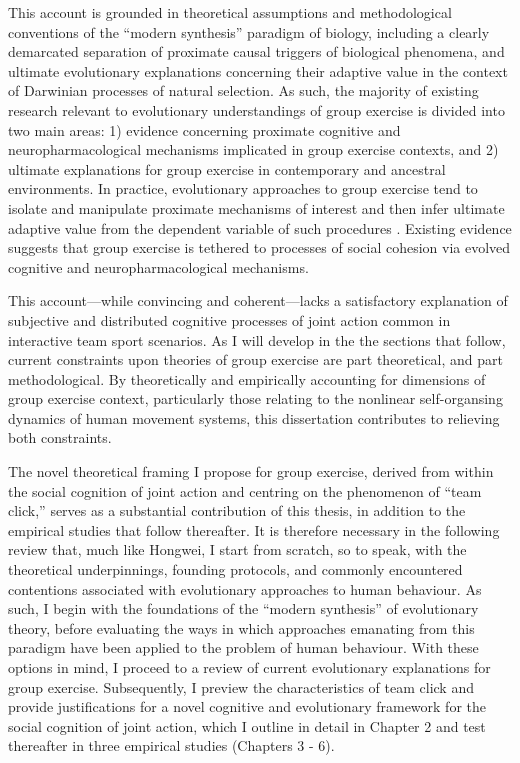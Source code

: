 This account is grounded in theoretical assumptions and methodological conventions of the ``modern synthesis'' paradigm of biology, including a clearly demarcated separation of proximate causal triggers of biological phenomena, and ultimate evolutionary explanations concerning their adaptive value in the context of Darwinian processes of natural selection.  As such, the majority of existing research relevant to evolutionary understandings of group exercise is divided into two main areas: 1) evidence concerning proximate cognitive and neuropharmacological mechanisms implicated in group exercise contexts, and 2) ultimate explanations for group exercise in contemporary and ancestral environments.  In practice, evolutionary approaches to group exercise tend to isolate and manipulate proximate mechanisms of interest and then infer ultimate adaptive value from the dependent variable of such procedures \citep[for example, health, wellbeing, social affiliation, reduce pain and anxiety, or increased athletic performance, ][]{Cohen2010,Davis2015,Cohen2017}. Existing evidence suggests that group exercise is tethered to processes of social cohesion via evolved cognitive and neuropharmacological mechanisms.

This account---while convincing and coherent---lacks a satisfactory explanation of subjective and distributed cognitive processes of joint action common in interactive team sport scenarios.  As I will develop in the the sections that follow, current constraints upon theories of group exercise are part theoretical, and part methodological.  By theoretically and empirically accounting for dimensions of group exercise context, particularly those relating to the nonlinear self-organsing dynamics of human movement systems, this dissertation contributes to relieving both constraints.

The novel theoretical framing I propose for group exercise, derived from within the social cognition of joint action and centring on the phenomenon of ``team click,'' serves as a substantial contribution of this thesis, in addition to the empirical studies that follow thereafter.  It is therefore necessary in the following review that, much like Hongwei, I start from scratch, so to speak, with the theoretical underpinnings, founding protocols, and commonly encountered contentions associated with evolutionary approaches to human behaviour.  As such, I begin with the foundations of the ``modern synthesis'' of evolutionary theory, before evaluating the ways in which approaches emanating from this paradigm have been applied to the problem of human behaviour.  With these options in mind, I proceed to a review of current evolutionary explanations for group exercise.  Subsequently, I preview the characteristics of team click and provide justifications for a novel cognitive and evolutionary framework for the social cognition of joint action, which I outline in detail in Chapter 2 and test thereafter in three empirical studies (Chapters 3 - 6).

